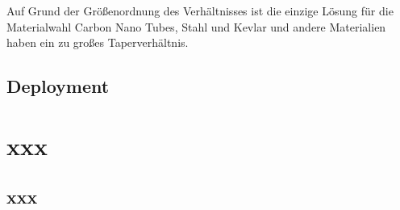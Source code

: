 \documentclass[a4paper, 10pt]{report}
\begin{document}
Auf Grund der Größenordnung des Verhältnisses ist die einzige Lösung für die Materialwahl Carbon Nano Tubes, Stahl und Kevlar und andere Materialien haben ein zu großes Taperverhältnis.



\section{Deployment}



{}


\appendix
\chapter{xxx}
\section{xxx}
\end{document}

